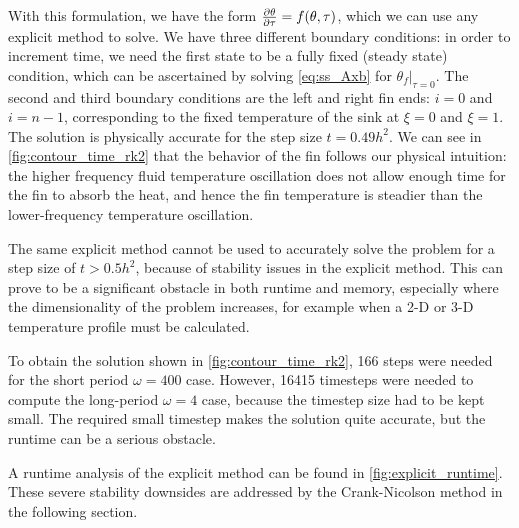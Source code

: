 \documentclass[10pt,letterpaper,notitlepage]{article}
\begin{document}
    With this formulation, we have the form $\pdv{\theta}{\tau} = f(\theta, \tau)$, which we can use any explicit method to solve. We have three different boundary conditions: in order to increment time, we need the first state to be a fully fixed (steady state) condition, which can be ascertained by solving \cref{eq:ss_Axb} for $\left. \theta_f \right|_{\tau=0}$. The second and third boundary conditions are the left and right fin ends: $i=0$ and $i=n-1$, corresponding to the fixed temperature of the sink at $\xi=0$ and $\xi=1$. 
    The solution is physically accurate for the step size $t=0.49 h^2$. We can see in \cref{fig:contour_time_rk2} that the behavior of the fin follows our physical intuition: the higher frequency fluid temperature oscillation does not allow enough time for the fin to absorb the heat, and hence the fin temperature is steadier than the lower-frequency temperature oscillation.
    
    The same explicit method cannot be used to accurately solve the problem for a step size of $t>0.5 h^2$, because of stability issues in the explicit method. This can prove to be a significant obstacle in both runtime and memory, especially where the dimensionality of the problem increases, for example when a 2-D or 3-D temperature profile must be calculated.

    To obtain the solution shown in \cref{fig:contour_time_rk2}, 166 steps were needed for the short period $\omega=400$ case. However, 16415 timesteps were needed to compute the long-period $\omega=4$ case, because the timestep size had to be kept small. The required small timestep makes the solution quite accurate, but the runtime can be a serious obstacle.

    A runtime analysis of the explicit method can be found in \cref{fig:explicit_runtime}.
    These severe stability downsides are addressed by the Crank-Nicolson method in the following section.
\end{document}

